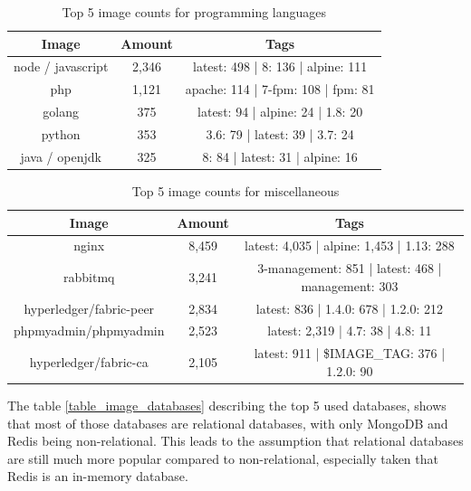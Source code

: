 \begin{table}[h!]
    \centering
    \begin{tabular}{ |c|c|c| }
    \hline
    Image & Amount & Tags \\
    \hline
         node / javascript & 2,346 & latest: 498 | 8: 136 | alpine: 111\\
         php & 1,121 & apache: 114 | 7-fpm: 108 | fpm: 81 \\
         golang & 375 & latest: 94 | alpine: 24 | 1.8: 20 \\
         python & 353 & 3.6: 79 | latest: 39 | 3.7: 24\\
         java / openjdk & 325 & 8: 84 | latest: 31 | alpine: 16\\
    \hline
    \end{tabular}
    \caption{Top 5 image counts for programming languages}
    \label{table_image_languages}
\end{table}

\begin{table}[h!]
    \centering
    \begin{tabular}{ |c|c|c| }
    \hline
    Image & Amount & Tags \\
    \hline
         nginx & 8,459 & latest: 4,035 | alpine: 1,453 | 1.13: 288\\
         rabbitmq & 3,241 & 3-management: 851 | latest: 468 | management: 303\\
         hyperledger/fabric-peer & 2,834 & latest: 836 | 1.4.0: 678 | 1.2.0: 212\\
         phpmyadmin/phpmyadmin & 2,523 & latest: 2,319 | 4.7: 38 | 4.8: 11 \\
         hyperledger/fabric-ca & 2,105 & latest: 911 | \$IMAGE\_TAG: 376 | 1.2.0: 90\\
    \hline
    \end{tabular}
    \caption{Top 5 image counts for miscellaneous}
    \label{table_image_misc}
\end{table}

The table \ref{table_image_databases} describing the top 5 used databases, shows that most of those databases are relational databases, with only MongoDB and Redis being non-relational. This leads to the assumption that relational databases are still much more popular compared to non-relational, especially taken that Redis is an in-memory database.

